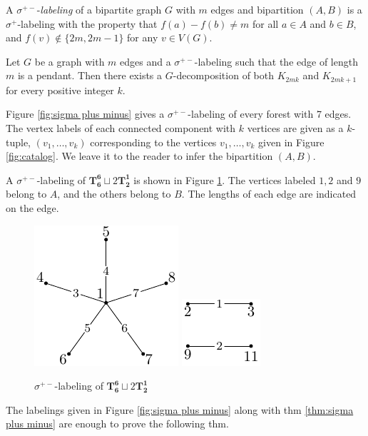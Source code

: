 \begin{definition} \label{def:sigma plus minus} 
A $\sigma^{+-}$-\emph{labeling} of a bipartite graph $G$ with $m$ edges and bipartition $(A,B)$ is a $\sigma^+$-labeling with the property that $f(a) - f(b) \neq m$ for all $a \in A$ and $b \in B$, and $f(v) \not\in \{2m,2m-1\}$ for any $v\in V(G)$.
\end{definition}

\begin{thm} \label{thm:sigma plus minus}
Let $G$ be a graph with $m$ edges and a $\sigma^{+-}$-labeling such that the edge of length $m$ is a pendant. Then there exists a $G$-decomposition of both $K_{2mk}$ and $K_{2mk+1}$ for every positive integer $k$.
\end{thm}

Figure \ref{fig:sigma plus minus} gives a $\sigma^{+-}$-labeling of every forest with 7 edges. The vertex labels of each connected component with $k$ vertices are given as a $k$-tuple, $(v_1,\dots ,v_k)$ corresponding to the vertices $v_1, \dots, v_k$ given in Figure \ref{fig:catalog}. We leave it to the reader to infer the bipartition $(A,B)$. 
\begin{example}
    A $\sigma^{+-}$-labeling of $\mathbf{T_{6}^{6}}\sqcup 2\mathbf{T_{2}^{1}}$ is shown in Figure \ref{fig:sigma label ex}. The vertices labeled $1,2$ and $9$ belong to $A$, and the others belong to $B$. The lengths of each edge are indicated on the edge.
    \begin{figure}[H]
        \centering
        \includegraphics[scale=1.0]{standalone/sigma label ex1.pdf}
         \includegraphics[scale=1.0]{standalone/sigma label ex2.pdf}
        \caption{$\sigma^{+-}$-labeling of $\mathbf{T_{6}^{6}}\sqcup 2\mathbf{T_{2}^{1}}$}
        \label{fig:sigma label ex}
    \end{figure}
\end{example}
 The labelings given in Figure \ref{fig:sigma plus minus} along with thm \ref{thm:sigma plus minus} are enough to prove the following thm.

